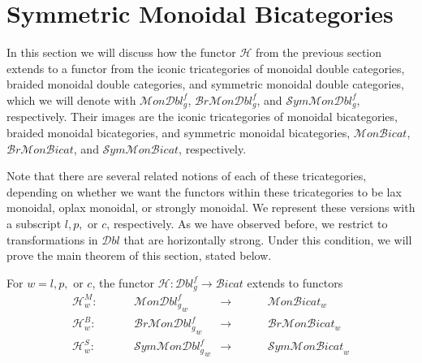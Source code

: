 \documentclass{amsart}
\begin{document}
\section{Symmetric Monoidal Bicategories}
\label{sec:constr-symm-mono}
In this section we will discuss how the functor $\mathcal{H}$ from the previous section extends to a functor from the iconic tricategories of monoidal double categories, braided monoidal double categories, and symmetric monoidal double categories, which we will denote with ${\mathcal{M}on\mathcal{D}bl^f_g}$, ${\mathcal{B}r\mathcal{M}on\mathcal{D}bl^f_g}$, and ${\mathcal{S}ym\mathcal{M}on\mathcal{D}bl^f_g}$, respectively. Their images are the iconic tricategories  of monoidal bicategories, braided monoidal bicategories, and symmetric monoidal bicategories, $\mathcal{M}on\mathcal{B}icat$, $\mathcal{B}r\mathcal{M}on\mathcal{B}icat$, and $\mathcal{S}ym\mathcal{M}on\mathcal{B}icat$, respectively.

Note that there are several related notions of each of these tricategories, depending on whether we want the functors within these tricategories to be lax monoidal, oplax monoidal, or strongly monoidal. We represent these versions with a subscript $ l,p,$ or $c$, respectively. 
As we have observed before, we restrict to transformations in $\mathcal{D}bl$ that are horizontally strong. Under this condition, we will prove the main theorem of this section, stated below. %

\begin{thm}\label{thm:trifunctor2}
For $w=l,p,$ or $c$, the functor $\mathcal{H}: \mathcal{D}bl^f_g \rightarrow \mathcal{B}icat$ extends to functors 
\begin{align}
\mathcal{H}^M_w: \hspace{1cm} &{\mathcal{M}on\mathcal{D}bl^f_g}_w &\rightarrow \hspace{1cm} &{\mathcal{M}on\mathcal{B}icat}_w\\
\mathcal{H}^{B}_w: \hspace{1cm} &{\mathcal{B}r\mathcal{M}on \mathcal{D}bl^f_g}_w &\rightarrow \hspace{1cm} &{\mathcal{B}r\mathcal{M}on\mathcal{B}icat}_w\\ 
 \mathcal{H}^{S}_w: \hspace{1cm} &{\mathcal{S}ym\mathcal{M}on\mathcal{D}bl^f_g}_w &\rightarrow \hspace{1cm} &{\mathcal{S}ym \mathcal{M}on\mathcal{B}icat}_w
\end{align} 
\end{thm}
\end{document}
